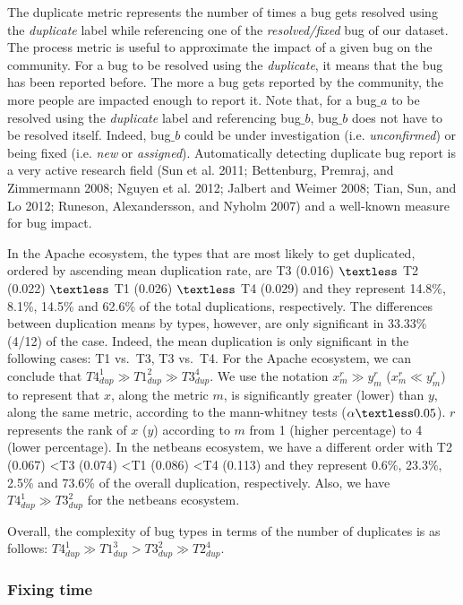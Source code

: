 \documentclass[natbib]{svjour3}
\begin{document}
The duplicate metric represents the number of times a bug gets resolved
using the \emph{duplicate} label while referencing one of the
\emph{resolved/fixed} bug of our dataset. The process metric is useful
to approximate the impact of a given bug on the community. For a bug to
be resolved using the \emph{duplicate}, it means that the bug has been
reported before. The more a bug gets reported by the community, the more
people are impacted enough to report it. Note that, for a bug\(\_a\) to
be resolved using the \emph{duplicate} label and referencing bug\(\_b\),
bug\(\_b\) does not have to be resolved itself. Indeed, bug\(\_b\) could
be under investigation (i.e. \emph{unconfirmed}) or being fixed (i.e.
\emph{new} or \emph{assigned}). Automatically detecting duplicate bug
report is a very active research field (Sun et al. 2011; Bettenburg,
Premraj, and Zimmermann 2008; Nguyen et al. 2012; Jalbert and Weimer
2008; Tian, Sun, and Lo 2012; Runeson, Alexandersson, and Nyholm 2007)
and a well-known measure for bug impact.

In the Apache ecosystem, the types that are most likely to get
duplicated, ordered by ascending mean duplication rate, are T3 (0.016)
\(\textless\) T2 (0.022) \(\textless\) T1 (0.026) \(\textless\) T4
(0.029) and they represent 14.8\%, 8.1\%, 14.5\% and 62.6\% of the total
duplications, respectively. The differences between duplication means by
types, however, are only significant in 33.33\% (4/12) of the case.
Indeed, the mean duplication is only significant in the following cases:
T1 vs.~T3, T3 vs.~T4. For the Apache ecosystem, we can conclude that
\(T4_{dup}^1 \gg T1_{dup}^2 \gg T3_{dup}^4\). We use the notation
\(x_{m}^r \gg y_{m}^r\) (\(x_{m}^r \ll y_{m}^r\)) to represent that
\(x\), along the metric \(m\), is significantly greater (lower) than
\(y\), along the same metric, according to the mann-whitney tests
(\(\alpha \textless 0.05\)). \(r\) represents the rank of \(x\) (\(y\))
according to \(m\) from 1 (higher percentage) to 4 (lower percentage).
In the netbeans ecosystem, we have a different order with T2 (0.067)
\textless T3 (0.074) \textless T1 (0.086) \textless T4 (0.113) and they
represent 0.6\%, 23.3\%, 2.5\% and 73.6\% of the overall duplication,
respectively. Also, we have \(T4_{dup}^1 \gg T3_{dup}^2\) for the
netbeans ecosystem.

Overall, the complexity of bug types in terms of the number of
duplicates is as follows:
\(T4_{dup}^{1} \gg T1_{dup}^{3} > T3_{dup}^{2} \gg T2_{dup}^{4}\).

\subsubsection{Fixing time}\label{fixing-time}
\end{document}
